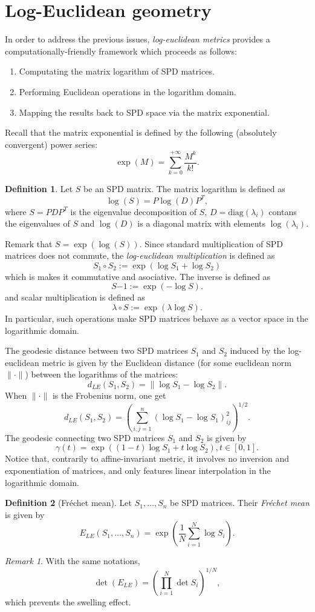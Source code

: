 \documentclass[10pt,a4paper]{book}
\theoremstyle{definition}
\newtheorem{defn}{Definition}[section]
\theoremstyle{plain}
\theoremstyle{remark}
\newtheorem{rmk}{Remark}[section]
\begin{document}
\section{Log-Euclidean geometry}
In order to address the previous issues, \emph{log-euclidean metrics} provides a computationally-friendly framework which proceeds as follows:
\begin{enumerate}
    \item Computating the matrix logarithm of SPD matrices.
    \item Performing Euclidean operations in the logarithm domain.
    \item Mapping the results back to SPD space via the matrix exponential.
\end{enumerate}
Recall that the matrix exponential is defined by the following (absolutely convergent) power series:
$$
\exp(M)=\sum_{k=0}^{+\infty}\frac{M^k}{k!}.
$$
\begin{defn}
    Let $S$ be an SPD matrix. The matrix logarithm is defined as
    $$
    \log(S)=P\log(D)P^T,
    $$
    where
    $S=PDP^T$ is the eigenvalue decomposition of $S$, $D=\text{diag}(\lambda_i)$ contans the eigenvalues of $S$ and $\log(D)$ is a diagonal matrix with elements $\log(\lambda_i)$.
\end{defn}
Remark that $S=\exp(\log(S))$. 
Since standard multiplication of SPD matrices does not commute, the \emph{log-euclidean multiplication} is defined as
$$
S_1 \circ S_2:=\exp(\log S_1 +\log S_2)
$$
which is makes it commutative and asociative. The inverse is defined as
$$S{-1}:=\exp(-\log S).
$$
and scalar multiplication is defined as
$$
\lambda \circ S := \exp(\lambda \log S).
$$
In particular, such operations make SPD matrices behave as a vector space in the logarithmic domain.
\par \medskip
The geodesic distance between two SPD matrices $S_1$ and $S_2$ induced by the log-euclidean metric 
is given by the Euclidean distance (for some euclidean norm $\|\cdot \|$) between the logarithms of the matrices:
$$
d_{LE}(S_1,S_2)=\|\log S_1 - \log S_2\|.
$$
When $\|\cdot \|$ is the Frobenius norm, one get
$$
d_{LE}(S_1,S_2)=\left ( \sum_{i,j=1}^{n}(\log S_1-\log S_1)^2_{ij}\right )^{1/2}.
$$
The geodesic connecting two SPD matrices $S_1$ and $S_2$ is given by
$$
\gamma(t)=\exp((1-t)\log S_1 +t \log S_2), t \in [0,1].
$$
Notice that, contrarily to affine-invariant metric, it involves no inversion and exponentiation of matrices, and only features linear interpolation in the logarithmic domain.
\begin{defn}[Fréchet mean]
Let $S_1, \dots, S_n$ be SPD matrices. Their \emph{Fréchet mean} is given by
$$
E_{LE}(S_1,\dots,S_n)=\exp\left ( \frac{1}{N}\sum_{i=1}^{N}\log S_i \right ).
$$
\end{defn}
\begin{rmk}
    With the same notations,
    $$\det(E_{LE})=\left (\prod_{i=1}^{N}\det S_i \right )^{1/N},$$
    which prevents the swelling effect.
\end{rmk}
\end{document}
